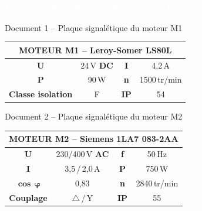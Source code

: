 \documentclass[12pt,a4paper]{article}
\newcommand{\partie}[2]{%
  \vspace{0.6cm}
  \noindent
  \begin{tcolorbox}[colback=mainblue, colframe=mainblue, arc=3pt, boxrule=0pt,
    left=6pt, right=6pt, top=4pt, bottom=4pt]
    \textcolor{white}{\textbf{Partie #1 -- #2}}
  \end{tcolorbox}
  \vspace{0.1cm}
}
\begin{document}
\vspace{0.2cm}

\partie{A}{Identification des moteurs \textnormal{(15 min)}}

\begin{docbox}{Document 1 -- Plaque signal\'{e}tique du moteur M1}
\begin{center}
\renewcommand{\arraystretch}{1.3}
\begin{tabular}{|c|c||c|c|}
\hline
\multicolumn{4}{|c|}{\textbf{MOTEUR M1 -- Leroy-Somer LS80L}} \\
\hline
\textbf{U} & 24\,V \textbf{DC} & \textbf{I} & 4{,}2\,A \\
\hline
\textbf{P} & 90\,W & \textbf{n} & 1500\,tr/min \\
\hline
\textbf{Classe isolation} & F & \textbf{IP} & 54 \\
\hline
\end{tabular}
\end{center}
\end{docbox}

\vspace{0.3cm}

\begin{docbox}{Document 2 -- Plaque signal\'{e}tique du moteur M2}
\begin{center}
\renewcommand{\arraystretch}{1.3}
\begin{tabular}{|c|c||c|c|}
\hline
\multicolumn{4}{|c|}{\textbf{MOTEUR M2 -- Siemens 1LA7 083-2AA}} \\
\hline
\textbf{U} & 230/400\,V \textbf{AC} & \textbf{f} & 50\,Hz \\
\hline
\textbf{I} & 3{,}5\,/\,2{,}0\,A & \textbf{P} & 750\,W \\
\hline
$\mathbf{\cos\,\varphi}$ & 0{,}83 & \textbf{n} & 2840\,tr/min \\
\hline
\textbf{Couplage} & $\triangle$\,/\,Y & \textbf{IP} & 55 \\
\hline
\end{tabular}
\end{center}
\end{docbox}

\vspace{0.3cm}
\end{document}
